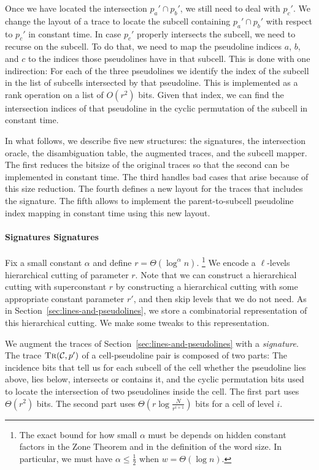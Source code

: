 Once we have located the intersection \(p_a' \cap p_b'\), we still need to deal
with \(p_c'\). We change the layout of a trace to locate the subcell containing
\(p_a' \cap p_b'\) with respect to \(p_c'\) in constant time.
%
In case \(p_c'\) properly intersects the subcell, we need to recurse on the
subcell. To do that, we need to map the pseudoline indices \(a\), \(b\), and
\(c\) to the indices those pseudolines have in that subcell. This is
done with one indirection:
%
For each of the three pseudolines we
identify the index of the subcell in the list of subcells intersected by that
pseudoline.
This is implemented as a rank operation on a list of \(O(r^2)\) bits.
%
Given that index, we can find the intersection indices of that pseudoline in
the cyclic permutation of the subcell in constant time.

In what follows, we describe five new structures:
the signatures,
the intersection oracle,
the disambiguation table,
the augmented traces,
and the subcell mapper.
%
The first reduces the bitsize of the original traces so that the second can
be implemented in constant time. The third handles bad cases that arise because
of this size reduction. The fourth defines a new layout for the traces that
includes the signature. The fifth allows to implement the parent-to-subcell
pseudoline index mapping in constant time using this new layout.
%
\paragraph*{\iftitlecase%
Signatures\else%
Signatures\fi}
Fix a small constant \(\alpha\) and define \(r = \Theta(\log^{\alpha} n)\).%
\footnote{%
  The exact bound for how small \(\alpha\)
  must be depends on hidden constant factors in the Zone Theorem and in the definition
  of the word size. In particular, we must have \(\alpha \leq \frac 12\) when
  \(w = \Theta(\log n)\).%
}
%
We encode a \(\ell\)-levels hierarchical cutting of parameter \(r\).
%
Note that we can construct a hierarchical cutting with
superconstant \(r\) by constructing a hierarchical cutting with some
appropriate constant parameter \(r'\), and then skip levels that we do not
need.
%
As in Section~\ref{sec:lines-and-pseudolines}, we store a combinatorial representation of
this hierarchical cutting. We make some tweaks to this representation.

We augment the traces of Section~\ref{sec:lines-and-pseudolines} with a \emph{signature}.
The trace \(\textsc{Tr}(\mathcal{C}, p')\) of a cell-pseudoline pair
is composed of two parts:
The incidence bits
that tell us for each subcell of the cell whether the pseudoline lies above, lies below, intersects
or contains it, and the cyclic permutation bits used to locate the intersection
of two pseudolines inside the cell.
The first part uses \(\Theta(r^2)\) bits.
The second part uses \(\Theta(r \log{\frac{N}{r^{i+1}}})\) bits for a cell of
level \(i\).

